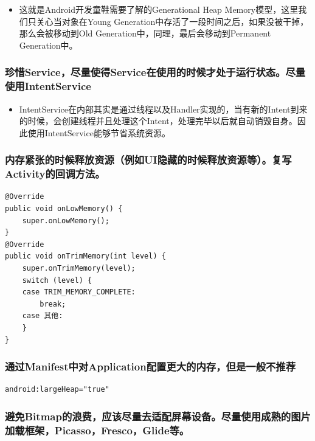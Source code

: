 \documentclass[9pt, b5paper]{article}
\begin{document}
\begin{itemize}
\item 这就是Android开发童鞋需要了解的Generational Heap Memory模型，这里我们只关心当对象在Young Generation中存活了一段时间之后，如果没被干掉，那么会被移动到Old Generation中，同理，最后会移动到Permanent Generation中。
\end{itemize}

\subsubsection{珍惜Service，尽量使得Service在使用的时候才处于运行状态。尽量使用IntentService}
\label{sec-1-1-1}
\begin{itemize}
\item IntentService在内部其实是通过线程以及Handler实现的，当有新的Intent到来的时候，会创建线程并且处理这个Intent，处理完毕以后就自动销毁自身。因此使用IntentService能够节省系统资源。
\end{itemize}
\subsubsection{内存紧张的时候释放资源（例如UI隐藏的时候释放资源等）。复写Activity的回调方法。}
\label{sec-1-1-2}
\begin{verbatim}
@Override 
public void onLowMemory() { 
    super.onLowMemory(); 
}  
@Override 
public void onTrimMemory(int level) { 
    super.onTrimMemory(level);  
    switch (level) { 
    case TRIM_MEMORY_COMPLETE: 
        break; 
    case 其他: 
    } 
}
\end{verbatim}
\subsubsection{通过Manifest中对Application配置更大的内存，但是一般不推荐}
\label{sec-1-1-3}
\begin{verbatim}
android:largeHeap="true"
\end{verbatim}
\subsubsection{避免Bitmap的浪费，应该尽量去适配屏幕设备。尽量使用成熟的图片加载框架，Picasso，Fresco，Glide等。}
\label{sec-1-1-4}
\end{document}
